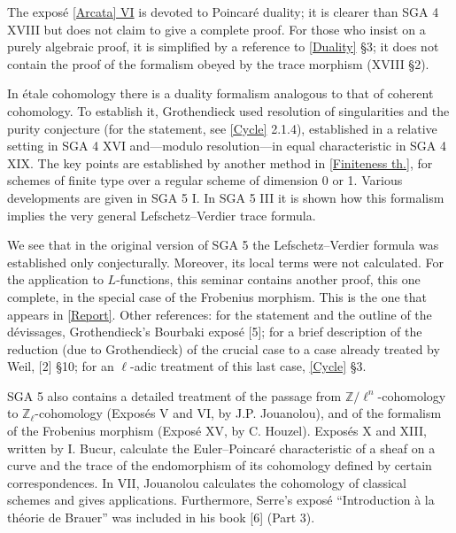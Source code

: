 The exposé \hyperref[I:6]{[Arcata] VI} is devoted to Poincaré duality; it is
clearer than SGA 4 XVIII but does not claim to give a complete proof. For those
who insist on a purely algebraic proof, it is simplified by a reference to
\hyperref[V]{[Duality]} §3; it does not contain the proof of the formalism
obeyed by the trace morphism (XVIII §2).

In étale cohomology there is a duality formalism analogous to that of coherent
cohomology. To establish it, Grothendieck used resolution of singularities
and the purity conjecture (for the statement, see \hyperref[IV]{[Cycle]}
2.1.4), established in a relative setting in SGA 4 XVI and---modulo
resolution---in equal characteristic in SGA 4 XIX. The key points are
established by another method in \hyperref[VII]{[Finiteness th.]}, for schemes
of finite type over a regular scheme of dimension 0 or 1. Various developments
are given in SGA 5 I. In SGA 5 III it is shown how this formalism implies the
very general Lefschetz--Verdier trace formula.

We see that in the original version of SGA 5 the Lefschetz--Verdier formula
was established only conjecturally. Moreover, its local terms were not
calculated. For the application to $L$-functions, this seminar contains
another proof, this one complete, in the special case of the Frobenius
morphism. This is the one that appears in \hyperref[II]{[Report]}. Other
references: for the statement and the outline of the dévissages,
Grothendieck's Bourbaki exposé [5]; for a brief description of the reduction
(due to Grothendieck) of the crucial case to a case already treated by Weil,
[2] §10; for an $\ell$-adic treatment of this last case,
\hyperref[IV]{[Cycle]} §3.

SGA 5 also contains a detailed treatment of the passage from
$\mathbb Z/\ell^n$-cohomology to $\mathbb Z_\ell$-cohomology (Exposés V and
VI, by J.P. Jouanolou), and of the formalism of the Frobenius morphism
(Exposé XV, by C. Houzel). Exposés X
and XIII, written by I. Bucur, calculate the Euler--Poincaré characteristic
of a sheaf on a curve and the trace of the endomorphism of its cohomology
defined by certain correspondences. In VII, Jouanolou calculates the
cohomology of classical schemes and gives applications. Furthermore, Serre's
exposé ``Introduction à la théorie de Brauer'' was included in his book [6]
(Part 3).

